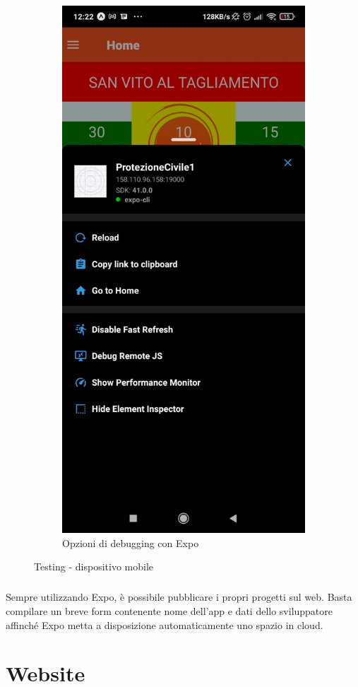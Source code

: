 \documentclass[12pt,a4paper,twoside,english,italian]{book}
\begin{document}
\begin{figure}[H]
\begin{subfigure}{.4\textwidth}
      \includegraphics[width=0.7\linewidth]{img/debug_app_2.jpeg}
      \caption{Opzioni di debugging con Expo}
    \end{subfigure}
    \caption{Testing - dispositivo mobile}
\end{figure}

\paragraph{} Sempre utilizzando Expo, è possibile pubblicare i propri progetti sul web. Basta compilare un breve form contenente nome dell'app e dati dello sviluppatore affinché Expo metta a disposizione automaticamente uno spazio in cloud. 


\chapter{Website}
\end{document}
